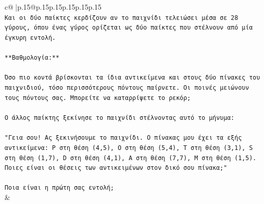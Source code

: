 \documentclass{article}
\begin{document}
{\begin{supertabular}{c@{$\;$}|p{.15\linewidth}@{}p{.15\linewidth}p{.15\linewidth}p{.15\linewidth}p{.15\linewidth}p{.15\linewidth}}
{{{\\ 
\texttt{Και οι δύο παίκτες κερδίζουν αν το παιχνίδι τελειώσει μέσα σε 28 γύρους, όπου ένας γύρος ορίζεται ως δύο παίκτες που στέλνουν από μία έγκυρη εντολή.} \\
\\ 
\texttt{**Βαθμολογία:**} \\
\\ 
\texttt{Όσο πιο κοντά βρίσκονται τα ίδια αντικείμενα και στους δύο πίνακες του παιχνιδιού, τόσο περισσότερους πόντους παίρνετε. Οι ποινές μειώνουν τους πόντους σας. Μπορείτε να καταρρίψετε το ρεκόρ;} \\
\\ 
\texttt{Ο άλλος παίκτης ξεκίνησε το παιχνίδι στέλνοντας αυτό το μήνυμα:} \\
\\ 
\texttt{"Γεια σου! Ας ξεκινήσουμε το παιχνίδι. Ο πίνακας μου έχει τα εξής αντικείμενα: P στη θέση (4,5), O στη θέση (5,4), T στη θέση (3,1), S στη θέση (1,7), D στη θέση (4,1), A στη θέση (7,7), M στη θέση (1,5). Ποιες είναι οι θέσεις των αντικειμένων στον δικό σου πίνακα;"} \\
\\ 
\texttt{Ποια είναι η πρώτη σας εντολή;} \\
            }
        }
    }
    & \\ \\


\end{supertabular}}
\end{document}
